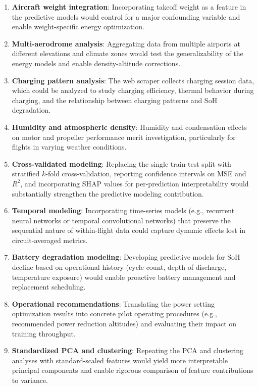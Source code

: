 \documentclass[11pt,a4paper]{article}
\begin{document}
\begin{enumerate}
    \item \textbf{Aircraft weight integration}: Incorporating takeoff weight as a feature in the predictive models would control for a major confounding variable and enable weight-specific energy optimization.

    \item \textbf{Multi-aerodrome analysis}: Aggregating data from multiple airports at different elevations and climate zones would test the generalizability of the energy models and enable density-altitude corrections.

    \item \textbf{Charging pattern analysis}: The web scraper collects charging session data, which could be analyzed to study charging efficiency, thermal behavior during charging, and the relationship between charging patterns and SoH degradation.

    \item \textbf{Humidity and atmospheric density}: Humidity and condensation effects on motor and propeller performance merit investigation, particularly for flights in varying weather conditions.

    \item \textbf{Cross-validated modeling}: Replacing the single train-test split with stratified $k$-fold cross-validation, reporting confidence intervals on MSE and $R^2$, and incorporating SHAP values for per-prediction interpretability would substantially strengthen the predictive modeling contribution.

    \item \textbf{Temporal modeling}: Incorporating time-series models (e.g., recurrent neural networks or temporal convolutional networks) that preserve the sequential nature of within-flight data could capture dynamic effects lost in circuit-averaged metrics.

    \item \textbf{Battery degradation modeling}: Developing predictive models for SoH decline based on operational history (cycle count, depth of discharge, temperature exposure) would enable proactive battery management and replacement scheduling.

    \item \textbf{Operational recommendations}: Translating the power setting optimization results into concrete pilot operating procedures (e.g., recommended power reduction altitudes) and evaluating their impact on training throughput.

    \item \textbf{Standardized PCA and clustering}: Repeating the PCA and clustering analyses with standard-scaled features would yield more interpretable principal components and enable rigorous comparison of feature contributions to variance.
\end{enumerate}
\end{document}
